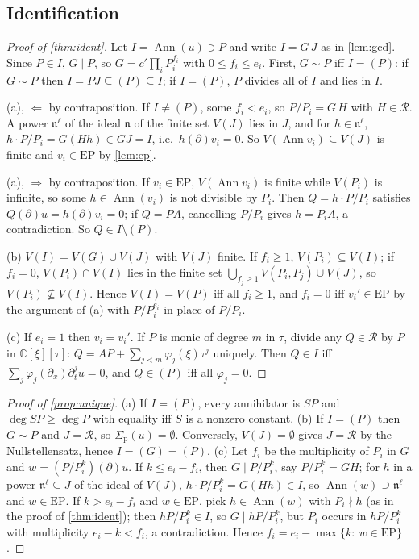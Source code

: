 \documentclass[11pt]{article}
\theoremstyle{plain}
\theoremstyle{definition}
\theoremstyle{remark}
\newcommand{\C}{\mathbb{C}}
\newcommand{\ring}{\mathcal{R}}            %
\DeclareMathOperator{\Ann}{Ann}             %
\newcommand{\Var}{V}                        %
\newcommand{\EP}{\mathrm{EP}}               %
\newcommand{\sigp}{\Sigma_{\mathrm p}}      %
\begin{document}
\subsection{Identification}
\begin{proof}[Proof of \cref{thm:ident}]
Let $I=\Ann(u)\ni P$ and write $I=G\,J$ as in \cref{lem:gcd}. Since $P\in I$, $G\mid P$, so
$G=c'\prod_iP_i^{f_i}$ with $0\le f_i\le e_i$. First, $G\sim P$ iff $I=(P)$: if $G\sim P$ then
$I=PJ\subseteq(P)\subseteq I$; if $I=(P)$, $P$ divides all of $I$ and lies in $I$.

(a), $\Leftarrow$ by contraposition. If $I\ne(P)$, some $f_i<e_i$, so $P/P_i=G\,H$ with $H\in\ring$. A power
$\mathfrak n^{\ell}$ of the ideal $\mathfrak n$ of the finite set $\Var(J)$ lies in $J$, and for $h\in\mathfrak n^{\ell}$,
$h\cdot P/P_i=G(Hh)\in GJ=I$, i.e.\ $h(\partial)v_i=0$. So $\Var(\Ann v_i)\subseteq\Var(J)$ is finite and
$v_i\in\EP$ by \cref{lem:ep}.

(a), $\Rightarrow$ by contraposition. If $v_i\in\EP$, $\Var(\Ann v_i)$ is finite while $\Var(P_i)$ is infinite, so
some $h\in\Ann(v_i)$ is not divisible by $P_i$. Then $Q=h\cdot P/P_i$ satisfies $Q(\partial)u=h(\partial)v_i=0$; if
$Q=PA$, cancelling $P/P_i$ gives $h=P_iA$, a contradiction. So $Q\in I\setminus(P)$.

(b) $\Var(I)=\Var(G)\cup\Var(J)$ with $\Var(J)$ finite. If $f_i\ge1$, $\Var(P_i)\subseteq\Var(I)$; if $f_i=0$,
$\Var(P_i)\cap\Var(I)$ lies in the finite set $\bigcup_{f_j\ge1}\Var(P_i,P_j)\cup\Var(J)$, so
$\Var(P_i)\not\subseteq\Var(I)$. Hence $\Var(I)=\Var(P)$ iff all $f_i\ge1$, and $f_i=0$ iff $v_i'\in\EP$ by the
argument of (a) with $P/P_i^{e_i}$ in place of $P/P_i$.

(c) If $e_i=1$ then $v_i=v_i'$. If $P$ is monic of degree $m$ in $\tau$, divide any $Q\in\ring$ by $P$ in
$\C[\xi][\tau]$: $Q=AP+\sum_{j<m}\varphi_j(\xi)\tau^j$ uniquely. Then $Q\in I$ iff $\sum_j\varphi_j(\partial_x)\partial_t^ju=0$, and
$Q\in(P)$ iff all $\varphi_j=0$.
\end{proof}

\begin{proof}[Proof of \cref{prop:unique}]
(a) If $I=(P)$, every annihilator is $SP$ and $\deg SP\ge\deg P$ with equality iff $S$ is a nonzero constant.
(b) If $I=(P)$ then $G\sim P$ and $J=\ring$, so $\sigp(u)=\emptyset$. Conversely, $\Var(J)=\emptyset$ gives $J=\ring$ by
the Nullstellensatz, hence $I=(G)=(P)$. (c) Let $f_i$ be the multiplicity of $P_i$ in $G$ and $w=(P/P_i^k)(\partial)u$. If $k\le e_i-f_i$, then
$G\mid P/P_i^k$, say $P/P_i^k=GH$; for $h$ in a power $\mathfrak n^{\ell}\subseteq J$ of the ideal of $\Var(J)$,
$h\cdot P/P_i^k=G(Hh)\in I$, so $\Ann(w)\supseteq\mathfrak n^{\ell}$ and $w\in\EP$. If $k>e_i-f_i$ and $w\in\EP$, pick
$h\in\Ann(w)$ with $P_i\nmid h$ (as in the proof of \cref{thm:ident}); then $hP/P_i^k\in I$, so $G\mid hP/P_i^k$, but
$P_i$ occurs in $hP/P_i^k$ with multiplicity $e_i-k<f_i$, a contradiction. Hence
$f_i=e_i-\max\{k:\ w\in\EP\}$.
\end{proof}
\end{document}
